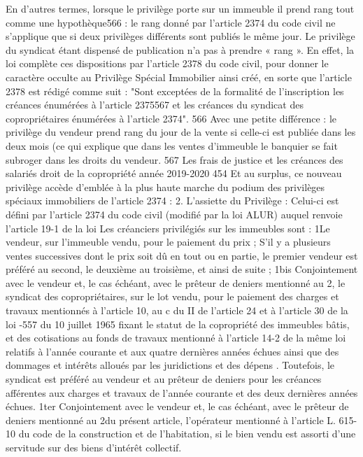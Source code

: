 En d’autres termes, lorsque le privilège porte sur un immeuble il prend rang tout comme une hypothèque566 : le rang donné par l’article 2374 du code civil ne s’applique que si deux privilèges différents sont publiés le même jour.
Le privilège du syndicat étant dispensé de publication n’a pas à prendre « rang ».
En effet, la loi complète ces dispositions par l'article 2378 du code civil, pour donner le caractère occulte au Privilège Spécial Immobilier ainsi créé, en sorte que l'article 2378 est rédigé comme suit :
"Sont exceptées de la formalité de l'inscription les créances énumérées à l'article 2375567 et les créances du syndicat des copropriétaires énumérées à l'article 2374".
566 Avec une petite différence : le privilège du vendeur prend rang du jour de la vente si celle-ci est publiée dans les deux mois (ce qui explique que dans les ventes d’immeuble le banquier se fait subroger dans les droits du vendeur.
567 Les frais de justice et les créances des salariés
droit de la copropriété année 2019-2020
454
Et au surplus, ce nouveau privilège accède d'emblée à la plus haute marche du podium des privilèges spéciaux immobiliers de l'article 2374 :
2. L’assiette du Privilège :
Celui-ci est défini par l’article 2374 du code civil (modifié par la loi ALUR) auquel renvoie l’article 19-1 de la loi
Les créanciers privilégiés sur les immeubles sont :
1\degres Le vendeur, sur l'immeuble vendu, pour le paiement du prix ;
S'il y a plusieurs ventes successives dont le prix soit dû en tout ou en partie, le premier vendeur est préféré au second, le deuxième au troisième, et ainsi de suite ;
1\degres bis Conjointement avec le vendeur et, le cas échéant, avec le prêteur de deniers mentionné au 2\degres, le syndicat des copropriétaires, sur le lot vendu, pour le paiement des charges et travaux mentionnés à l’article 10, au c du II de l’article 24 et à l’article 30 de la loi -557 du 10 juillet 1965 fixant le statut de la copropriété des immeubles bâtis, et des cotisations au fonds de travaux mentionné à l’article 14-2 de la même loi relatifs à l'année courante et aux quatre dernières années échues ainsi que des dommages et intérêts alloués par les juridictions et des dépens .
Toutefois, le syndicat est préféré au vendeur et au prêteur de deniers pour les créances afférentes aux charges et travaux de l'année courante et des deux dernières années échues.
1\degres ter Conjointement avec le vendeur et, le cas échéant, avec le prêteur de deniers mentionné au 2\degres du présent article, l’opérateur mentionné à l’article L. 615-10 du code de la construction et de l’habitation, si le bien vendu est assorti d’une servitude sur des biens d’intérêt collectif.
